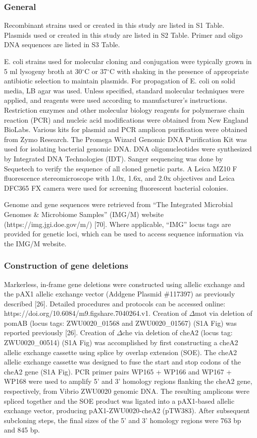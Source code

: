 \subsubsection{General}
Recombinant strains used or created in this study are listed in S1 Table. Plasmids used or created in this study are listed in S2 Table. Primer and oligo DNA sequences are listed in S3 Table. 

E. coli strains used for molecular cloning and conjugation were typically grown in 5 ml lysogeny broth at 30$^\circ$C or 37$^\circ$C with shaking in the presence of appropriate antibiotic selection to maintain plasmids. For propagation of E. coli on solid media, LB agar was used. Unless specified, standard molecular techniques were applied, and reagents were used according to manufacturer's instructions. Restriction enzymes and other molecular biology reagents for polymerase chain reaction (PCR) and nucleic acid modifications were obtained from New England BioLabs. Various kits for plasmid and PCR amplicon purification were obtained from Zymo Research. The Promega Wizard Genomic DNA Purification Kit was used for isolating bacterial genomic DNA. DNA oligonucleotides were synthesized by Integrated DNA Technologies (IDT). Sanger sequencing was done by Sequetech to verify the sequence of all cloned genetic parts. A Leica MZ10 F fluorescence stereomicroscope with 1.0x, 1.6x, and 2.0x objectives and Leica DFC365 FX camera were used for screening fluorescent bacterial colonies. 

Genome and gene sequences were retrieved from ``The Integrated Microbial Genomes \& Microbiome Samples'' (IMG/M) website (https://img.jgi.doe.gov/m/) [70]. Where applicable, ``IMG'' locus tags are provided for genetic loci, which can be used to access sequence information via the IMG/M website. 

\subsubsection{Construction of gene deletions}
Markerless, in-frame gene deletions were constructed using allelic exchange and the pAX1 allelic exchange vector (Addgene Plasmid \#117397) as previously described [26]. Detailed procedures and protocols can be accessed online: https://doi.org/10.6084/m9.figshare.7040264.v1. Creation of $\Delta$mot via deletion of pomAB (locus tags: ZWU0020\_01568 and ZWU0020\_01567) (S1A Fig) was reported previously [26]. Creation of $\Delta$che via deletion of cheA2 (locus tag: ZWU0020\_00514) (S1A Fig) was accomplished by first constructing a cheA2 allelic exchange cassette using splice by overlap extension (SOE). The cheA2 allelic exchange cassette was designed to fuse the start and stop codons of the cheA2 gene (S1A Fig). PCR primer pairs WP165 + WP166 and WP167 + WP168 were used to amplify 5' and 3' homology regions flanking the cheA2 gene, respectively, from Vibrio ZWU0020 genomic DNA. The resulting amplicons were spliced together and the SOE product was ligated into a pAX1-based allelic exchange vector, producing pAX1-ZWU0020-cheA2 (pTW383). After subsequent subcloning steps, the final sizes of the 5' and 3' homology regions were 763 bp and 845 bp.   

